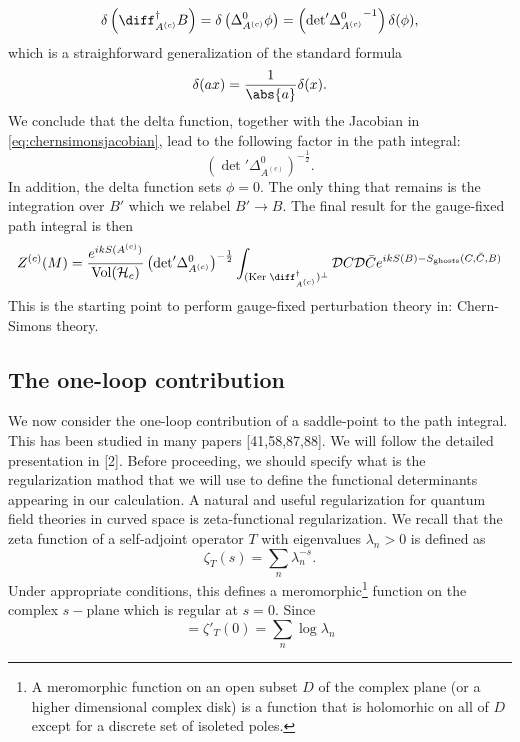 \begin{equation}
  \delta\left(\diff_{A^{(c)}}^\dagger B\right)
  = \delta\left(\Delta^0_{A^{(c)}}\phi\right)
  = \left({\det}'{\Delta^0_{A^{(c)}}}^{-1}\right)\delta(\phi),
\end{equation}
which is a straighforward generalization of the standard formula
\begin{equation}
  \delta(ax) = \frac{1}{\abs{a}}\delta(x).
\end{equation}
We conclude that the delta function, together with the Jacobian in
\eqref{eq:chernsimonsjacobian}, lead to the following factor in
the path integral:
\begin{equation}
  ({\det}'\Delta^0_{A^{(c)}})^{-\frac{1}{2}}.
\end{equation}
In addition, the delta function sets $\phi=0$. The only thing that remains is
the integration over $B'$ which we relabel $B'\rightarrow B$. The  final result
for the gauge-fixed path integral is then
\begin{equation}
  Z^{(c)}(M)
  = \frac{e^{ikS(A^{(c)})}}{\mathrm{Vol}(\mathcal{H}_c)}\left({\det}'\Delta^0_{A^{(c)}}\right)^{-\frac{1}{2}}\int_{(\mathrm{Ker}\;\diff^\dagger_{A^{(c)}})^\bot}\mathcal{D}C\mathcal{D}\bar{C}e^{ikS(B)-S_{\mathrm{ghosts}}(C,\bar{C},B)}
\end{equation}
This is the starting point to perform gauge-fixed perturbation theory in:
Chern-Simons theory. 
\subsection{The one-loop contribution}
We now consider the one-loop contribution of a saddle-point to the path
integral. This has been studied in many papers [41,58,87,88]. We will follow
the detailed presentation in [2]. Before proceeding, we should specify what is
the regularization mathod that we will use to define the functional determinants
appearing in our calculation. A natural and useful regularization for quantum
field theories in curved space is zeta-functional regularization. We recall
that the zeta function of a self-adjoint operator $T$ with eigenvalues
$\lambda_n>0$ is defined as
\begin{equation}
  \zeta_T(s) = \sum_n{\lambda_n^{-s}.}
\end{equation}
Under appropriate conditions, this defines a meromorphic\footnote{A meromorphic
  function on an open subset $D$ of the complex plane (or a higher dimensional
  complex disk) is a function that is holomorhic on all of $D$ except for
a discrete set of isoleted poles.} function on the complex $s-$plane which is
regular at $s=0$. Since
\begin{equation}
  =\zeta'_T(0) = \sum_n{\log{\lambda_n}}
\end{equation}

